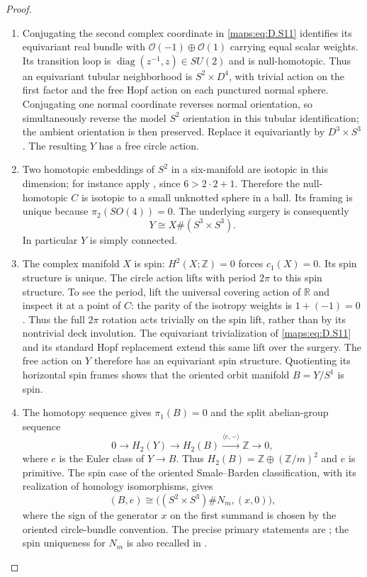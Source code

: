 \begin{proof}
\begin{enumerate}[label=\arabic*.,leftmargin=*]
\item Conjugating the second complex coordinate in \eqref{maps:eq:D.S11}
identifies its equivariant real bundle with
$\mathcal O(-1)\oplus\mathcal O(1)$ carrying equal
scalar weights. Its transition loop is
$\operatorname{diag}(z^{-1},z)\in SU(2)$ and is
null-homotopic. Thus an equivariant tubular neighborhood
is $S^2\times D^4$, with trivial action on the first
factor and the free Hopf action on each punctured
normal sphere. Conjugating one normal coordinate reverses
normal orientation, so simultaneously reverse the model
$S^2$ orientation in this tubular identification; the
ambient orientation is then preserved.
Replace it equivariantly by $D^3\times S^3$.
The resulting $Y$ has a free circle action.

\item Two homotopic embeddings of $S^2$ in a six-manifold
are isotopic in this dimension; for instance apply
\cite[Theorem 2.9]{manGR25}, since $6>2\cdot2+1$.
Therefore the null-homotopic $C$ is isotopic to a small
unknotted sphere in a ball. Its framing is unique because
$\pi_2(SO(4))=0$. The underlying surgery is consequently
\[
                         Y\cong X\#(S^3\times S^3).
 \tag{D.S12}\label{maps:eq:D.S12}
\]
In particular $Y$ is simply connected.

\item The complex manifold $X$ is spin: $H^2(X;\mathbb Z)=0$
forces $c_1(X)=0$. Its spin structure is unique.
The circle action lifts with period $2\pi$ to this spin
structure. To see the period, lift the universal covering
action of $\mathbb R$ and inspect it at a point of $C$:
the parity of the isotropy weights is $1+(-1)=0$.
Thus the full $2\pi$ rotation acts trivially on the spin
lift, rather than by its nontrivial deck involution.
The equivariant trivialization of \eqref{maps:eq:D.S11} and its standard
Hopf replacement extend this same lift over the surgery.
The free action on $Y$ therefore has an equivariant spin
structure. Quotienting its horizontal spin frames shows
that the oriented orbit manifold $B=Y/S^1$ is spin.

\item The homotopy sequence gives $\pi_1(B)=0$ and the split
abelian-group sequence
\[
 0\longrightarrow H_2(Y)\longrightarrow H_2(B)
       \xrightarrow{\langle e,-\rangle}\mathbb Z
       \longrightarrow0,
\]
where $e$ is the Euler class of $Y\to B$. Thus
$H_2(B)=\mathbb Z\oplus(\mathbb Z/m)^2$ and $e$ is
primitive. The spin case of the oriented Smale--Barden
classification, with its realization of homology
isomorphisms, gives
\[
 (B,e)\cong\bigl((S^2\times S^3)\#N_m,(x,0)\bigr),
 \tag{D.S13}\label{maps:eq:D.S13}
\]
where the sign of the generator $x$ on the first summand
is chosen by the oriented circle-bundle convention.
The precise primary statements are
\cite[Theorems 2.2--2.3]{manBarden65}; the spin uniqueness
for $N_m$ is also recalled in \cite[Section 4.3]{manReiser24}.


\end{enumerate}
\end{proof}

